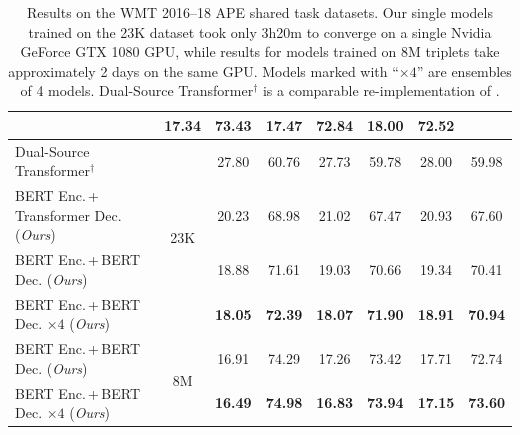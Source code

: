 \begin{table}[t]
\begin{tabular}{lccccccc}
    \multicolumn{1}{c}{}                             &
    17.34                                            & 73.43          & 17.47                         & 72.84          & 18.00 & 72.52 \\
    \midrule
    \midrule
    Dual-Source Transformer$^\dagger$                &
    \multicolumn{1}{c}{\multirow{4}{*}{23K}}         &
    27.80                                            & 60.76          & 27.73                         & 59.78          & 28.00 & 59.98 \\
    BERT Enc.\,+\,Transformer Dec. (\emph{Ours})     &
    \multicolumn{1}{c}{}                             &
    20.23                                            & 68.98          & 21.02                         & 67.47          & 20.93 & 67.60 \\
    BERT Enc.\,+\,BERT Dec. (\emph{Ours})            &
    \multicolumn{1}{c}{}                             &
    18.88                                            & 71.61          & 19.03                         & 70.66          & 19.34 & 70.41 \\
    BERT Enc.\,+\,BERT Dec. $\times 4$ (\emph{Ours}) &
    \multicolumn{1}{c}{}                             &
    \textbf{18.05}                                   & \textbf{72.39} & \textbf{18.07}                &
    \textbf{71.90}                                   & \textbf{18.91} & \textbf{70.94}                                                 \\
    \midrule
    BERT Enc.\,+\,BERT Dec. (\emph{Ours})            &
    \multicolumn{1}{c}{\multirow{2}{*}{8M}}          &
    16.91                                            & 74.29          & 17.26                         & 73.42          & 17.71 & 72.74 \\
    BERT Enc.\,+\,BERT Dec. $\times 4$ (\emph{Ours}) &
    \multicolumn{1}{c}{}                             &
    \textbf{16.49}                                   & \textbf{74.98} & \textbf{16.83}                &
    \textbf{73.94}                                   & \textbf{17.15} & \textbf{73.60}                                                 \\
    \bottomrule
  \end{tabular}
  \caption{Results on the WMT 2016--18 APE shared task datasets. Our
    single models trained on the 23K dataset took only 3h20m to converge
    on a single Nvidia GeForce GTX 1080 GPU, while results for models
    trained on 8M triplets take approximately 2 days on the same GPU.
    Models marked with ``$\times 4$'' are ensembles of 4 models.
    Dual-Source Transformer$^\dagger$ is a comparable re-implementation
    of \citet{junczys2018ms}.}
  \label{tab:results_smt}
\end{table}

